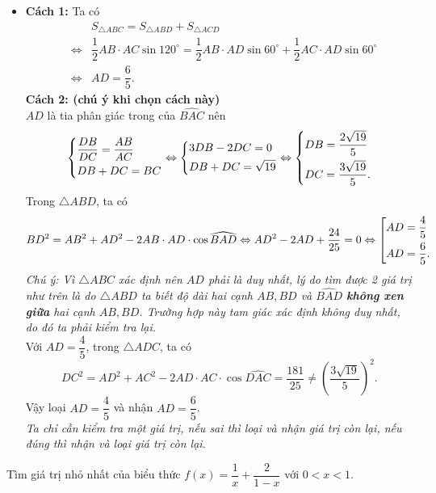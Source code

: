 \begin{bt}
{\begin{itemize}
		\item 
		\textbf{Cách 1:} Ta có
		\begin{eqnarray*}
			& & S_{\triangle ABC} = S_{\triangle ABD} + S_{\triangle ACD} \\
			& \Leftrightarrow & \dfrac{1}{2}AB\cdot AC \sin 120^\circ = \dfrac{1}{2}AB\cdot AD \sin 60^\circ + \dfrac{1}{2}AC\cdot AD \sin 60^\circ \\
			& \Leftrightarrow & AD = \dfrac{6}{5}.
		\end{eqnarray*} 
		\textbf{Cách 2: (chú ý khi chọn cách này)} \\
		$ AD $ là tia phân giác trong của $ \widehat{BAC} $ nên
			$$ \left\{\begin{aligned}&\dfrac{DB}{DC} = \dfrac{AB}{AC} \\ &DB+DC=BC\end{aligned}\right. \Leftrightarrow \left\{\begin{aligned}&3DB-2DC=0 \\ &DB+DC=\sqrt{19}\end{aligned}\right. \Leftrightarrow \left\{\begin{aligned}&DB = \dfrac{2\sqrt{19}}{5} \\ &DC=\dfrac{3\sqrt{19}}{5}.\end{aligned}\right. $$
		Trong $\triangle ABD$, ta có
		$$ BD^2 = AB^2+AD^2-2AB \cdot AD \cdot \cos\widehat{BAD} \Leftrightarrow AD^2-2AD + \dfrac{24}{25} = 0 \Leftrightarrow \left[\begin{aligned}&AD=\dfrac{4}{5} \\ &AD = \dfrac{6}{5}.\end{aligned}\right. $$
		\textit{Chú ý: Vì $ \triangle ABC $ xác định nên $ AD $ phải là duy nhất, lý do tìm được 2 giá trị như trên là do $ \triangle ABD $ ta biết độ dài hai cạnh $ AB,BD $ và $ \widehat{BAD} $ \textbf{không xen giữa} hai cạnh $ AB,BD $. Trường hợp này tam giác xác định không duy nhất, do đó ta phải kiểm tra lại.}\\
		Với $ AD=\dfrac{4}{5} $, trong $ \triangle ADC $, ta có
			$$ DC^2 = AD^2+AC^2-2AD \cdot AC \cdot \cos\widehat{DAC} = \dfrac{181}{25} \ne \left(\dfrac{3\sqrt{19}}{5} \right)^2. $$
		Vậy loại $ AD=\dfrac{4}{5} $ và nhận $ AD=\dfrac{6}{5} $.\\
		\textit{Ta chỉ cần kiểm tra một giá trị, nếu sai thì loại và nhận giá trị còn lại, nếu đúng thì nhận và loại giá trị còn lại}.
	\end{itemize}
}
\end{bt}

\begin{bt}%
Tìm giá trị nhỏ nhất của biểu thức $ f(x)=\dfrac{1}{x}+\dfrac{2}{1-x} $ với $ 0<x<1 $.
\end{bt}